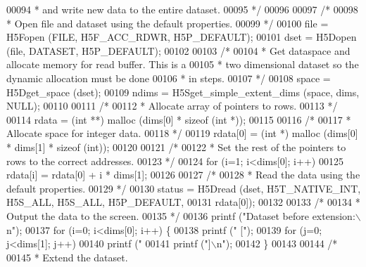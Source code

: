 \begin{DoxyCode}
00094 \textcolor{comment}{     * and write new data to the entire dataset.}
00095 \textcolor{comment}{     */}
00096 
00097     \textcolor{comment}{/*}
00098 \textcolor{comment}{     * Open file and dataset using the default properties.}
00099 \textcolor{comment}{     */}
00100     file = H5Fopen (FILE, H5F\_ACC\_RDWR, H5P\_DEFAULT);
00101     dset = H5Dopen (file, DATASET, H5P\_DEFAULT);
00102 
00103     \textcolor{comment}{/*}
00104 \textcolor{comment}{     * Get dataspace and allocate memory for read buffer.  This is a}
00105 \textcolor{comment}{     * two dimensional dataset so the dynamic allocation must be done}
00106 \textcolor{comment}{     * in steps.}
00107 \textcolor{comment}{     */}
00108     space = H5Dget\_space (dset);
00109     ndims = H5Sget\_simple\_extent\_dims (space, dims, NULL);
00110 
00111     \textcolor{comment}{/*}
00112 \textcolor{comment}{     * Allocate array of pointers to rows.}
00113 \textcolor{comment}{     */}
00114     rdata = (\textcolor{keywordtype}{int} **) malloc (dims[0] * \textcolor{keyword}{sizeof} (\textcolor{keywordtype}{int} *));
00115 
00116     \textcolor{comment}{/*}
00117 \textcolor{comment}{     * Allocate space for integer data.}
00118 \textcolor{comment}{     */}
00119     rdata[0] = (\textcolor{keywordtype}{int} *) malloc (dims[0] * dims[1] * \textcolor{keyword}{sizeof} (\textcolor{keywordtype}{int}));
00120 
00121     \textcolor{comment}{/*}
00122 \textcolor{comment}{     * Set the rest of the pointers to rows to the correct addresses.}
00123 \textcolor{comment}{     */}
00124     \textcolor{keywordflow}{for} (i=1; i<dims[0]; i++)
00125         rdata[i] = rdata[0] + i * dims[1];
00126 
00127     \textcolor{comment}{/*}
00128 \textcolor{comment}{     * Read the data using the default properties.}
00129 \textcolor{comment}{     */}
00130     status = H5Dread (dset, H5T\_NATIVE\_INT, H5S\_ALL, H5S\_ALL, H5P\_DEFAULT,
00131                 rdata[0]);
00132 
00133     \textcolor{comment}{/*}
00134 \textcolor{comment}{     * Output the data to the screen.}
00135 \textcolor{comment}{     */}
00136     printf (\textcolor{stringliteral}{"Dataset before extension:\(\backslash\)n"});
00137     \textcolor{keywordflow}{for} (i=0; i<dims[0]; i++) \{
00138         printf (\textcolor{stringliteral}{" ["});
00139         \textcolor{keywordflow}{for} (j=0; j<dims[1]; j++)
00140             printf (\textcolor{stringliteral}{" %
00141         printf (\textcolor{stringliteral}{"]\(\backslash\)n"});
00142     \}
00143 
00144     \textcolor{comment}{/*}
00145 \textcolor{comment}{     * Extend the dataset.}
}
\end{DoxyCode}
